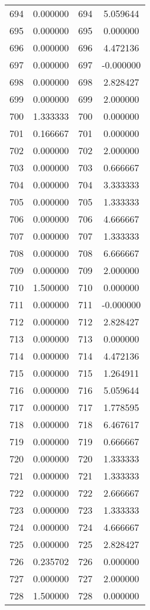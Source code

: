 \documentclass[12pt]{article}
\begin{document}
\begin{longtable}{@{}cccc@{}}
694 & 0.000000 & 694 & 5.059644 \\
695 & 0.000000 & 695 & 0.000000 \\
696 & 0.000000 & 696 & 4.472136 \\
697 & 0.000000 & 697 & -0.000000 \\
698 & 0.000000 & 698 & 2.828427 \\
699 & 0.000000 & 699 & 2.000000 \\
700 & 1.333333 & 700 & 0.000000 \\
701 & 0.166667 & 701 & 0.000000 \\
702 & 0.000000 & 702 & 2.000000 \\
703 & 0.000000 & 703 & 0.666667 \\
704 & 0.000000 & 704 & 3.333333 \\
705 & 0.000000 & 705 & 1.333333 \\
706 & 0.000000 & 706 & 4.666667 \\
707 & 0.000000 & 707 & 1.333333 \\
708 & 0.000000 & 708 & 6.666667 \\
709 & 0.000000 & 709 & 2.000000 \\
710 & 1.500000 & 710 & 0.000000 \\
711 & 0.000000 & 711 & -0.000000 \\
712 & 0.000000 & 712 & 2.828427 \\
713 & 0.000000 & 713 & 0.000000 \\
714 & 0.000000 & 714 & 4.472136 \\
715 & 0.000000 & 715 & 1.264911 \\
716 & 0.000000 & 716 & 5.059644 \\
717 & 0.000000 & 717 & 1.778595 \\
718 & 0.000000 & 718 & 6.467617 \\
719 & 0.000000 & 719 & 0.666667 \\
720 & 0.000000 & 720 & 1.333333 \\
721 & 0.000000 & 721 & 1.333333 \\
722 & 0.000000 & 722 & 2.666667 \\
723 & 0.000000 & 723 & 1.333333 \\
724 & 0.000000 & 724 & 4.666667 \\
725 & 0.000000 & 725 & 2.828427 \\
726 & 0.235702 & 726 & 0.000000 \\
727 & 0.000000 & 727 & 2.000000 \\
728 & 1.500000 & 728 & 0.000000 \\

\end{longtable}
\end{document}
